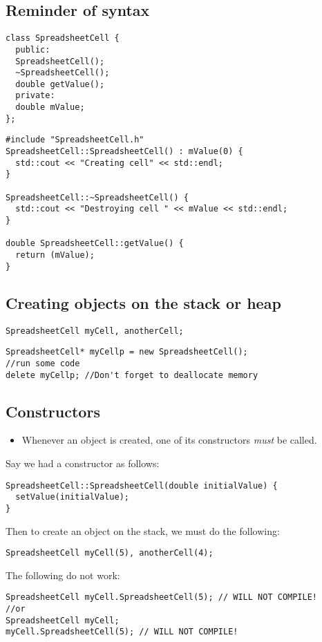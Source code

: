 \documentclass[a4paper,12pt]{article}
\begin{document}
\subsection{Reminder of syntax}
\begin{lstlisting}[caption={SpreadsheetCell.h}]
class SpreadsheetCell {
  public:
  SpreadsheetCell();
  ~SpreadsheetCell();
  double getValue();
  private:
  double mValue;
};
\end{lstlisting}
\begin{lstlisting}[caption={SpreadsheetCell.cpp}]
#include "SpreadsheetCell.h"
SpreadsheetCell::SpreadsheetCell() : mValue(0) {
  std::cout << "Creating cell" << std::endl;
}

SpreadsheetCell::~SpreadsheetCell() {
  std::cout << "Destroying cell " << mValue << std::endl;
}

double SpreadsheetCell::getValue() {
  return (mValue);
}
\end{lstlisting}
\subsection{Creating objects on the stack or heap}
\begin{lstlisting}[caption={Creating objects on the stack}]
SpreadsheetCell myCell, anotherCell;
\end{lstlisting}
\begin{lstlisting}[caption={Creating objects on the heap}]
SpreadsheetCell* myCellp = new SpreadsheetCell();
//run some code
delete myCellp; //Don't forget to deallocate memory
\end{lstlisting}

\subsection{Constructors}
\begin{itemize}
  \item Whenever an object is created, one of its constructors \emph{must} be called.
\end{itemize}

Say we had a constructor as follows:
\begin{lstlisting}
SpreadsheetCell::SpreadsheetCell(double initialValue) {
  setValue(initialValue);
}
\end{lstlisting}
Then to create an object on the stack, we must do the following:
\begin{lstlisting}
SpreadsheetCell myCell(5), anotherCell(4);
\end{lstlisting}
The following do not work:
\begin{lstlisting}
SpreadsheetCell myCell.SpreadsheetCell(5); // WILL NOT COMPILE!
//or
SpreadsheetCell myCell;
myCell.SpreadsheetCell(5); // WILL NOT COMPILE!
\end{lstlisting}
\end{document}
